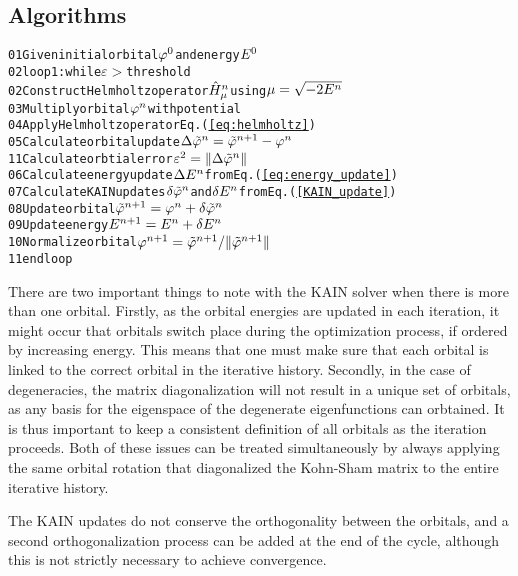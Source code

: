 \subsection{Algorithms}
\begin{alltt}
01 Given initial orbital \(\varphi\sp{0}\) and energy \(E\sp{0}\)
02 loop1: while \(\varepsilon > \) threshold
02     Construct Helmholtz operator \(\hat{H}\sp{n}\sb{\mu}\) using \(\mu = \sqrt{-2E\sp{n}}\)
03     Multiply orbital \(\varphi\sp{n}\) with potential
04     Apply Helmholtz operator Eq.(\ref{eq:helmholtz})
05     Calculate orbital update \(\Delta\tilde{\varphi}\sp{n} = \tilde{\varphi}\sp{n+1}-\varphi\sp{n}\)
11     Calculate orbtial error \(\varepsilon^2 = \|\Delta\tilde{\varphi}\sp{n}\|\) 
06     Calculate energy update \(\Delta{E}\sp{n}\) from Eq.(\ref{eq:energy_update})
07     Calculate KAIN updates \(\delta\tilde{\varphi}\sp{n}\) and \(\delta{E}\sp{n}\) from Eq.(\ref{KAIN_update}) 
08     Update orbital \(\tilde{\varphi}\sp{n+1} = \varphi\sp{n} + \delta\tilde{\varphi}\sp{n}\)
09     Update energy \(E\sp{n+1} = E\sp{n}+\delta{E}\sp{n}\)
10     Normalize orbital \(\varphi\sp{n+1} = \tilde{\varphi}\sp{n+1}/\|\tilde{\varphi}\sp{n+1}\|\)
11 end loop
\end{alltt}

There are two important things to note with the KAIN solver when there is more 
than one orbital. Firstly, as the orbital energies are updated in each iteration, 
it might occur that orbitals switch place during the optimization process, if 
ordered by increasing energy. This means that one must make sure that each 
orbital is linked to the correct orbital in the iterative history. Secondly, 
in the case of degeneracies, the matrix diagonalization will not result in a 
unique set of orbitals, as any basis for the eigenspace of the degenerate 
eigenfunctions can orbtained. It is thus important to keep a consistent 
definition of all orbitals as the iteration proceeds. Both of these issues 
can be treated simultaneously by always applying the same orbital rotation 
that diagonalized the Kohn-Sham matrix to the entire iterative history.

The KAIN updates do not conserve the orthogonality between the orbitals, 
and a second orthogonalization process can be added at the end of the cycle, 
although this is not strictly necessary to achieve convergence.
 
